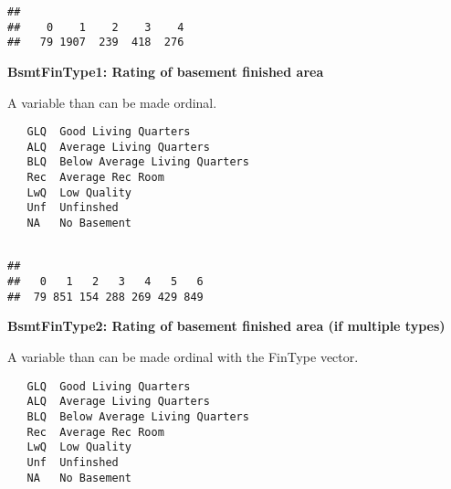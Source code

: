 \documentclass[]{article}
\newenvironment{Shaded}{\begin{snugshade}}{\end{snugshade}}
\newcommand{\KeywordTok}[1]{\textcolor[rgb]{0.13,0.29,0.53}{\textbf{#1}}}
\newcommand{\DecValTok}[1]{\textcolor[rgb]{0.00,0.00,0.81}{#1}}
\newcommand{\StringTok}[1]{\textcolor[rgb]{0.31,0.60,0.02}{#1}}
\newcommand{\OperatorTok}[1]{\textcolor[rgb]{0.81,0.36,0.00}{\textbf{#1}}}
\newcommand{\NormalTok}[1]{#1}
\begin{document}
\begin{verbatim}
## 
##    0    1    2    3    4 
##   79 1907  239  418  276
\end{verbatim}

\textbf{BsmtFinType1: Rating of basement finished area}

A variable than can be made ordinal.

\begin{verbatim}
   GLQ  Good Living Quarters
   ALQ  Average Living Quarters
   BLQ  Below Average Living Quarters   
   Rec  Average Rec Room
   LwQ  Low Quality
   Unf  Unfinshed
   NA   No Basement
    
\end{verbatim}

\begin{Shaded}
\end{Shaded}

\begin{verbatim}
## 
##   0   1   2   3   4   5   6 
##  79 851 154 288 269 429 849
\end{verbatim}

\textbf{BsmtFinType2: Rating of basement finished area (if multiple
types)}

A variable than can be made ordinal with the FinType vector.

\begin{verbatim}
   GLQ  Good Living Quarters
   ALQ  Average Living Quarters
   BLQ  Below Average Living Quarters   
   Rec  Average Rec Room
   LwQ  Low Quality
   Unf  Unfinshed
   NA   No Basement
\end{verbatim}
\end{document}
